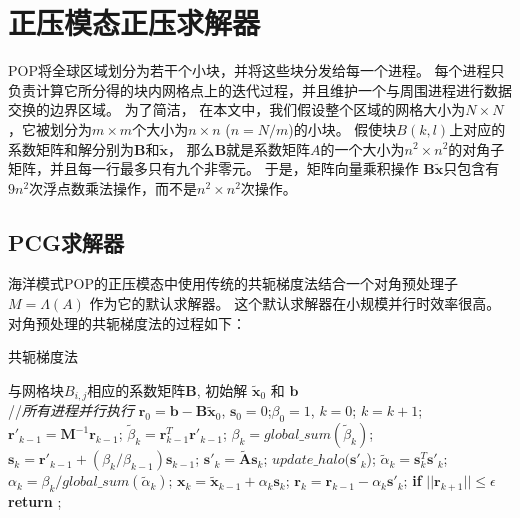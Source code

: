 \section{正压模态正压求解器}
\label{solver:bottleneck}

POP将全球区域划分为若干个小块，并将这些块分发给每一个进程。
每个进程只负责计算它所分得的块内网格点上的迭代过程，并且维护一个与周围进程进行数据交换的边界区域。 
为了简洁， 在本文中，我们假设整个区域的网格大小为$N\times N$，它被划分为$m\times m$个大小为$n\times n$ ($n=N/m$)的小块。 
假使块$B(k,l)$上对应的系数矩阵和解分别为$\textbf{B}$和$\tilde{\textbf{x}}$， 那么$\textbf{B}$就是系数矩阵$A$的一个大小为$n^2\times n^2$的对角子矩阵，并且每一行最多只有九个非零元\cite{hu2013scalable}。 
于是，矩阵向量乘积操作 $\textbf{B}\tilde{\textbf{x}}$只包含有$9n^2$次浮点数乘法操作，而不是$n^2\times n^2$次操作。 
 
\subsection{PCG求解器} 
\label{solver:pcg}
 
海洋模式POP的正压模态中使用传统的共轭梯度法结合一个对角预处理子$M = \Lambda(A)$ 作为它的默认求解器。 
这个默认求解器在小规模并行时效率很高。 
对角预处理的共轭梯度法的过程如下： 

\begin{algorithm}[h]
\caption{共轭梯度法}
\label{alg:pcg}
\begin{algorithmic}[1]
\REQUIRE  与网格块$B_{i,j}$相应的系数矩阵$\textbf{B}$,  初始解 $\tilde{\textbf{x}}_0$ 和 $\textbf{b}$  \\
//\qquad    \textit{所有进程并行执行}
\STATE $\textbf{r}_0 = \textbf{b}-\textbf{B}\tilde{\textbf{x}}_0$, $\textbf{s}_0 =0$;\quad $\beta_0=1$, $k=0$;
\STATE $k=k+1$; 
\STATE $\textbf{r}'_{k-1} =\textbf{M}^{-1}\textbf{r}_{k-1}$;  \label{AlgPcgPrecond}
\STATE $\tilde{\beta}_k = \textbf{r}_{k-1}^T\textbf{r}'_{k-1}$; \label{AlgPcgInner1}
\STATE $\beta_k = global\_sum(\tilde{\beta}_k)$;  \label{AlgPcgGlobal1}
\STATE $\textbf{s}_k = \textbf{r}'_{k-1} +(\beta_k/\beta_{k-1})\textbf{s}_{k-1}$;\label{AlgPcgVec1}
\STATE $\textbf{s}'_k = \tilde{\textbf{A}}\textbf{s}_k$; \label{AlgPcgAx}
\STATE $update\_halo(\textbf{s}'_k$); \label{AlgPcgBound}
\STATE $\tilde{\alpha}_k = \textbf{s}_k^T\textbf{s}'_k$; \label{AlgPcgInner2}
\STATE $\alpha_k =\beta_k/ global\_sum(\tilde{\alpha}_k)$;\quad {}\label{AlgPcgGlobal2}
\STATE $\textbf{x}_k =\tilde{\textbf{x}}_{k-1} +\alpha_k \textbf{s}_k$;\label{AlgPcgVec2}
\STATE $\textbf{r}_k =\textbf{r}_{k-1} -\alpha_k\textbf{s}'_k$;\label{AlgPcgVec3}
\STATE \textbf{if} $||\textbf{r}_{k+1}|| \le \epsilon$  \textbf{return} ;
\ENDIF
\ENDWHILE
\end{algorithmic}
\end{algorithm}

